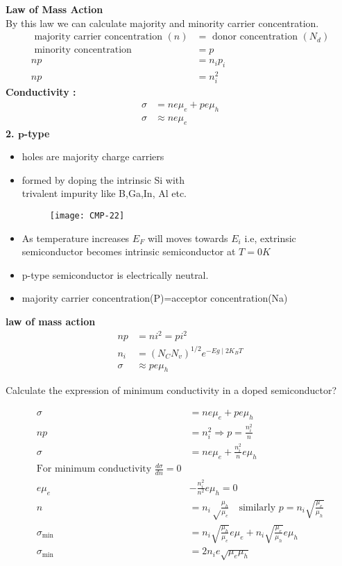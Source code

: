 \textbf{Law of Mass Action}\\
By this law we can calculate majority and minority carrier concentration.
\begin{align*}
\text { majority carrier concentration }(n)&=\text { donor concentration }\left(N_{d}\right)\\
\text { minority concentration}&= p\\
n p&=n_i p_{i}\\
n p&=n_i^{2}
\end{align*}
\textbf{Conductivity :}
\begin{align*}
\sigma&=n e \mu_{e}+p e \mu_{h} \\
\sigma &\approx n e \mu_{e}
\end{align*}
\textbf{2. $\mathbf{p}$-type} 
\begin{itemize}
	\item holes are majority charge carriers 
	\item formed by doping the intrinsic Si with\\
	trivalent impurity like B,Ga,In, Al etc.
	\begin{figure}[H]
		\centering
		\texttt{[image: CMP-22]}
		\caption{}
		\label{}
	\end{figure}
	\item As temperature increases $E_F$ will moves towards $E_i$
	i.e, extrinsic semiconductor becomes intrinsic semiconductor
	at $T=0K$
	\item p-type semiconductor is electrically neutral.
	\item majority carrier concentration(P)=acceptor concentration(Na)
\end{itemize}
\textbf{law of mass action}
\begin{align*}
n p&=n i^{2}=p i^{2}\\
n_{i}&=\left(N_{C} N_{v}\right)^{1 / 2} e^{-E g \mid 2 K_{B} T}\\
\sigma &\approx p e \mu_{h}
\end{align*}

\begin{exercise}
	Calculate the expression of minimum conductivity in a doped semiconductor?
\end{exercise}
\begin{answer}
	\begin{align*}
	\sigma&=n e \mu_{e}+p e \mu_{h}\\
	n p&=n_i^{2} \Rightarrow p=\frac{n_{i}^{2}}{n}\\
	\sigma&=n e \mu_{e}+\frac{n_{i}^{2}}{n} e \mu_{h}\\
	\text{For minimum conductivity }\frac{d \sigma}{d n}=0\\
	e \mu_{e}&-\frac{n_{i}^{2}}{n^{2}} e \mu_{h}=0\\
	n&=n_{i}\sqrt\frac{\mu_h}{\mu_{e}}\quad\text{similarly }p=n_i \sqrt{\frac{\mu _e}{\mu_h}}\\
	\sigma_{\min }&=n_{i} \sqrt{\frac{\mu_{h}}{\mu_{e}}} e \mu_{e}+n_{i} \sqrt{\frac{\mu_{e}}{\mu_{h}}} e \mu_{h}\\
	\sigma_{\min }&=2 n_{i} e \sqrt{\mu_{e} \mu_{h}}
	\end{align*}
\end{answer}

